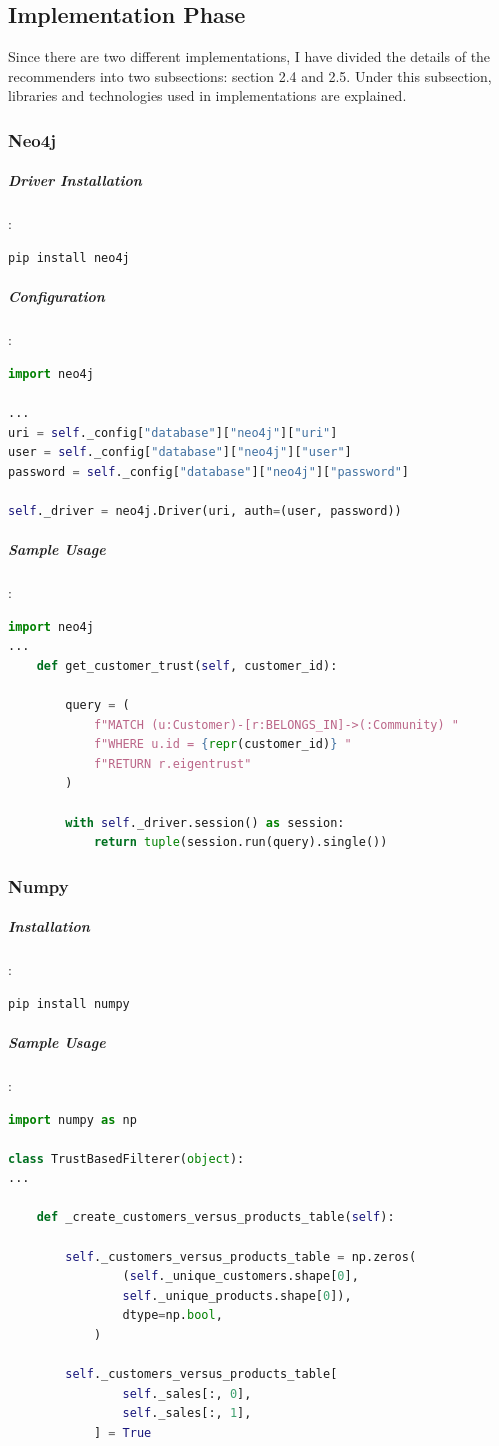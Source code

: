 \documentclass[12pt]{article}
\begin{document}
\subsection{Implementation Phase}
Since there are two different implementations, I have divided the details of the recommenders into two subsections: section 2.4 and 2.5. Under this subsection, libraries and technologies used in implementations are explained.
\subsubsection{Neo4j}
\subparagraph{Driver Installation}:
\begin{lstlisting}[language=bash]
pip install neo4j
\end{lstlisting}

\subparagraph{Configuration}:
\begin{lstlisting}[language=python]
import neo4j

...
uri = self._config["database"]["neo4j"]["uri"]
user = self._config["database"]["neo4j"]["user"]
password = self._config["database"]["neo4j"]["password"]

self._driver = neo4j.Driver(uri, auth=(user, password))

\end{lstlisting}

\subparagraph{Sample Usage}:
\begin{lstlisting}[language=python, caption=Neo4j cypher example]
import neo4j
...
    def get_customer_trust(self, customer_id):

		query = (
			f"MATCH (u:Customer)-[r:BELONGS_IN]->(:Community) "
			f"WHERE u.id = {repr(customer_id)} "
			f"RETURN r.eigentrust"
		)

		with self._driver.session() as session:
			return tuple(session.run(query).single())

\end{lstlisting}

\subsubsection{Numpy}
\subparagraph{Installation}:
\begin{lstlisting}[language=bash]
pip install numpy
\end{lstlisting}

\subparagraph{Sample Usage}:
\begin{lstlisting}[language=python, caption=Numpy example]
import numpy as np

class TrustBasedFilterer(object):
...

	def _create_customers_versus_products_table(self):

		self._customers_versus_products_table = np.zeros(
				(self._unique_customers.shape[0],
				self._unique_products.shape[0]),
				dtype=np.bool,
			)
			
		self._customers_versus_products_table[
				self._sales[:, 0],
				self._sales[:, 1],
			] = True
\end{lstlisting}
\end{document}
